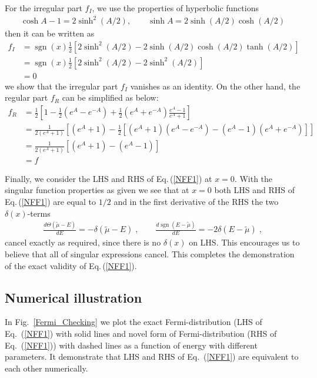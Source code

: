\documentclass[sn-mathphys,Numbered]{sn-jnl}
\DeclareMathOperator{\sgn}{sgn}
\begin{document}
For the irregular part $f_I$, we use the properties of hyperbolic functions
\begin{align}
\cosh A-1= 2\sinh^2(A/2), \qquad\sinh A=2 \sinh(A/2) \cosh(A/2)
\end{align}
then it can be written as
\begin{align}
f_I&=\sgn(x) \frac{1}{2} \left[ 2\sinh^2(A/2) - 2 \sinh(A/2) \cosh(A/2) \tanh (A/2)\right]\\
&=\sgn(x) \frac{1}{2}\left[2\sinh^2(A/2)-2\sinh^2(A/2)\right]\\
&=0
\end{align}
we show that the irregular part $f_I$ vanishes as an identity. On the other hand, the regular part $f_R$ can be simplified as below:
\begin{align}
f_R&=\frac{1}{2}\left[1-\frac{1}{2}\left(e^A-e^{-A}\right)+\frac{1}{2}\left(e^A+e^{-A}\right)\frac{e^A-1}{e^A+1}\right]\\
&=\frac{1}{2(e^A+1)}\left[\left(e^A+1\right)-\frac{1}{2}\left[\left(e^A+1\right)\left(e^A-e^{-A}\right)-\left(e^A-1\right)\left(e^A+e^{-A}\right)\right]\right]\\
&=\frac{1}{2(e^A+1)}\left[\left(e^A+1\right)-\left(e^A-1\right)\right]\\
&=f
\end{align}


Finally, we consider the LHS and RHS of Eq.\,(\ref{NFF1}) at $x=0$. With the singular function properties as given we see that at $x=0$ both LHS and RHS of Eq.\,(\ref{NFF1}) are equal to $1/2$ and in the first derivative of the  RHS the two $\delta(x)$-terms 
\begin{align}\label{NFF1b}
\frac{d\Theta(\widetilde\mu-E)}{dE}=-\delta(\widetilde\mu-E)\;,\qquad 
\frac{d\sgn(E -\widetilde\mu)}{dE}=-2\delta(E-\widetilde\mu)\;, 
\end{align}
cancel exactly as required, since there is no $\delta(x)$ on LHS. This encourages us to believe that all of singular expressions cancel. This completes the demonstration of the exact validity of  Eq.\,(\ref{NFF1}). 

\subsection{Numerical illustration}
In Fig.~\ref{Fermi_Checking} we plot the exact Fermi-distribution (LHS of Eq.~(\ref{NFF1}) with solid lines and novel form of Fermi-distribution (RHS of Eq.~(\ref{NFF1})) with dashed lines as a function of energy with different parameters. It demonstrate that 
LHS and RHS of Eq.~(\ref{NFF1}) are equivalent to each other numerically.
\end{document}

